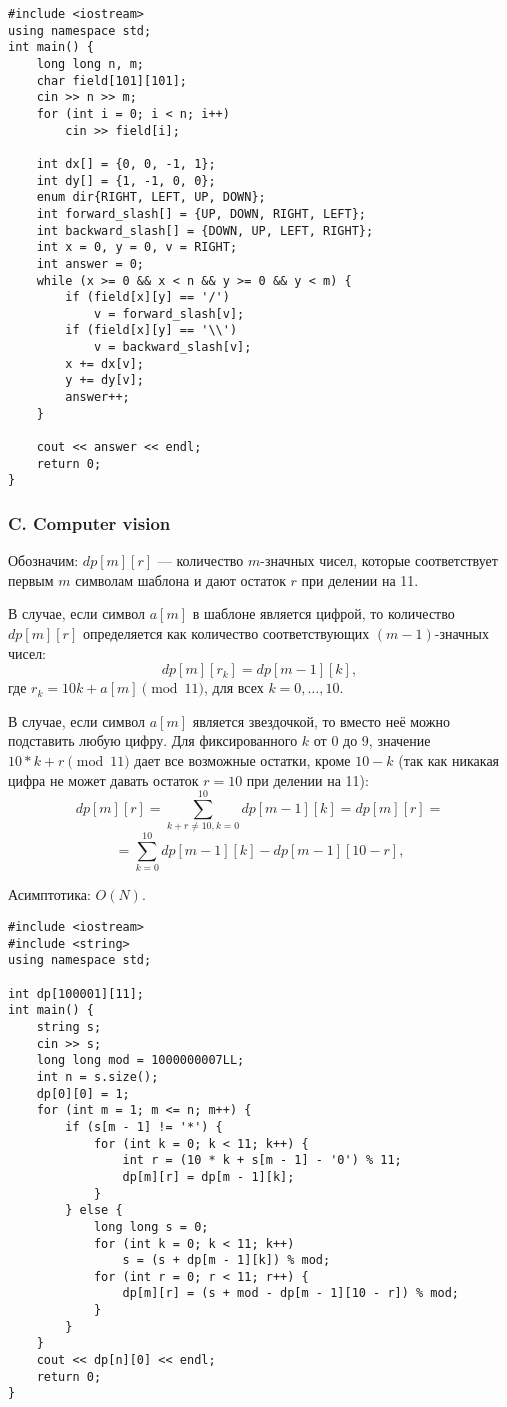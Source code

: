 \begin{lstlisting}
#include <iostream>
using namespace std;
int main() {
    long long n, m;
    char field[101][101];
    cin >> n >> m;
    for (int i = 0; i < n; i++)
        cin >> field[i];

    int dx[] = {0, 0, -1, 1};
    int dy[] = {1, -1, 0, 0};
    enum dir{RIGHT, LEFT, UP, DOWN};
    int forward_slash[] = {UP, DOWN, RIGHT, LEFT};
    int backward_slash[] = {DOWN, UP, LEFT, RIGHT};
    int x = 0, y = 0, v = RIGHT;
    int answer = 0;
    while (x >= 0 && x < n && y >= 0 && y < m) {
        if (field[x][y] == '/')
            v = forward_slash[v];
        if (field[x][y] == '\\')
            v = backward_slash[v];
        x += dx[v];
        y += dy[v];
        answer++;
    }

    cout << answer << endl;
    return 0;
}
\end{lstlisting}



\subsubsection*{C. Computer vision}

Обозначим: $ dp[m][r]$ --- количество $m$-значных чисел, которые соответствует первым $m$ символам шаблона и дают остаток $r$ при делении на 11.

В случае, если символ $a[m]$ в шаблоне является цифрой, то количество $dp[m][r]$ определяется как количество соответствующих $(m-1)$-значных чисел:
$$
dp[m][r_k] = dp[m-1][k], 
$$
где $r_k = 10 k + a[m] \pmod {11}$, для всех $k = 0, \dots, 10$.

В случае, если символ $a[m]$ является звездочкой, то вместо неё можно подставить любую цифру. Для фиксированного $k$ от 0 до 9, значение $10 * k + r \pmod {11}$ дает все возможные остатки, кроме $10 - k$ (так как никакая цифра не может давать остаток $r = 10$ при делении на 11): 
$$
dp[m][r] = \sum_{k + r \neq 10, k = 0}^{10} dp[m-1][k] = dp[m][r] = 
$$
$$
=\sum_{k = 0}^{10} dp[m-1][k] - dp[m-1][10 - r],
$$

Асимптотика: $O(N)$. 

\begin{lstlisting}
#include <iostream>
#include <string>
using namespace std;

int dp[100001][11];
int main() {
    string s;
    cin >> s;
    long long mod = 1000000007LL;
    int n = s.size();
    dp[0][0] = 1;
    for (int m = 1; m <= n; m++) {
        if (s[m - 1] != '*') {
            for (int k = 0; k < 11; k++) {
                int r = (10 * k + s[m - 1] - '0') % 11;
                dp[m][r] = dp[m - 1][k];
            }
        } else {
            long long s = 0;
            for (int k = 0; k < 11; k++)
                s = (s + dp[m - 1][k]) % mod;
            for (int r = 0; r < 11; r++) {
                dp[m][r] = (s + mod - dp[m - 1][10 - r]) % mod;
            }
        }
    }
    cout << dp[n][0] << endl;
    return 0;
}
\end{lstlisting}



